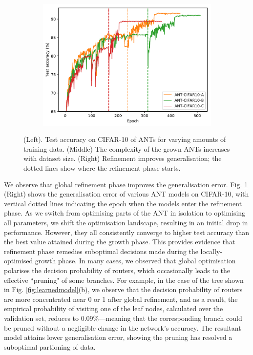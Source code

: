 \begin{figure}[t!]
\begin{subfigure}[t]{0.32\linewidth}
		\includegraphics[width=\linewidth]{chapter_7/figures/fig_3_2.pdf}
	\end{subfigure}
	\caption{\footnotesize (Left). Test accuracy on CIFAR-10 of ANTs for varying amounts of training data. (Middle) The complexity of the grown ANTs increases with dataset size. (Right) Refinement improves generalisation; the dotted lines show where the refinement phase starts.}
	\label{fig:cifar10}
\end{figure}

We observe that global refinement phase improves the generalisation error. Fig. \ref{fig:cifar10} (Right) shows the generalisation error of various ANT models on CIFAR-10, with vertical dotted lines indicating the epoch when the models enter the refinement phase. As we switch from optimising parts of the ANT in isolation to optimising all parameters, we shift the optimisation landscape, resulting in an initial drop in performance. However, they all consistently converge to higher test accuracy than the best value attained during the growth phase. This provides evidence that refinement phase remedies suboptimal decisions made during the locally-optimised growth phase. In many cases, we observed that global optimisation polarises the decision probability of routers, which occasionally leads to the effective ``pruning" of some branches. For example, in the case of the tree shown in Fig. \ref{fig:learnedmodel}(b), we observe that the decision probability of routers are more concentrated near 0 or 1 after global refinement, and as a result, the empirical probability of visiting one of the leaf nodes, calculated over the validation set, reduces to 0.09\%---meaning that the corresponding branch could be pruned without a negligible change in the network's accuracy. The resultant model attains lower generalisation error, showing the pruning has resolved a suboptimal partioning of data. 

